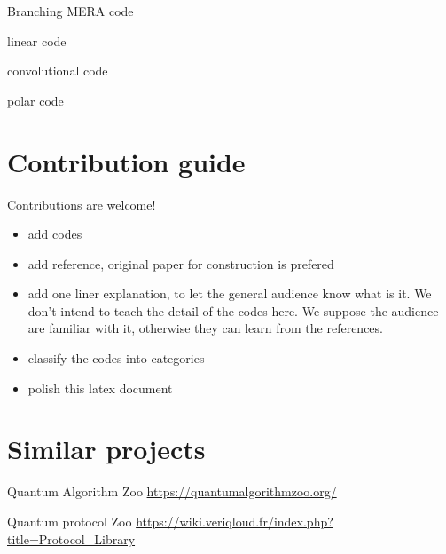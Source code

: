 \documentclass[aps,%
pra, twocolumn,%
notitlepage,longbibliography]{revtex4-2}
\begin{document}
Branching MERA code~\cite{ferris2014branching}

linear code

convolutional code

polar code






\section{Contribution guide}
Contributions are welcome!
\begin{itemize}
\item add codes
\item add reference, original paper for construction is prefered
\item add one liner explanation, to let the general audience know what
  is it. We don't intend to teach the detail of the codes here. We
  suppose the audience are familiar with it, otherwise they can learn
  from the references.
\item classify the codes into categories
\item polish this latex document
\end{itemize}

\section{Similar projects}
Quantum Algorithm Zoo 
\url{https://quantumalgorithmzoo.org/}

Quantum protocol Zoo
\url{https://wiki.veriqloud.fr/index.php?title=Protocol_Library}

%

\end{document}
